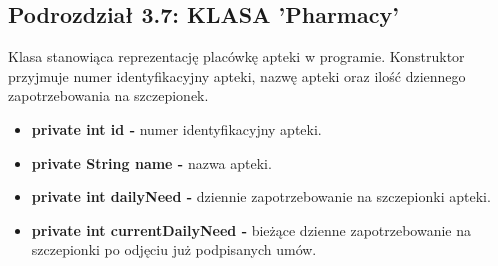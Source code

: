 \documentclass[a4paper]{article}
\begin{document}
\subsection*{Podrozdział 3.7: KLASA 'Pharmacy'}
\begin{flushleft}
Klasa stanowiąca reprezentację placówkę apteki w programie. Konstruktor przyjmuje numer identyfikacyjny apteki, nazwę apteki oraz ilość dziennego zapotrzebowania na szczepionek.
\end{flushleft} 
\begin{itemize}
\item \textbf{private int id -} numer identyfikacyjny apteki.
\item \textbf{private String name -} nazwa apteki.
\item \textbf{private int dailyNeed -} dziennie zapotrzebowanie na szczepionki apteki.
\item \textbf{private int currentDailyNeed -} bieżące dzienne zapotrzebowanie na szczepionki po odjęciu już podpisanych umów.
\end{itemize}
\end{document}
